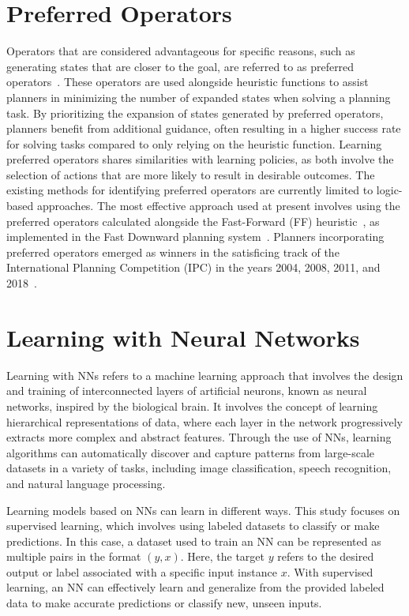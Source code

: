 \documentclass[ppgc,diss,english]{iiufrgs}
\begin{document}
\section{Preferred Operators}
\label{sec:intro-preferred-ops}
Operators that are considered advantageous for specific reasons, such as generating states that are closer to the goal, are referred to as preferred operators~\cite{Helmert/2006,Richter.Helmert/2009}. These operators are used alongside heuristic functions to assist planners in minimizing the number of expanded states when solving a planning task.
By prioritizing the expansion of states generated by preferred operators, planners benefit from additional guidance, often resulting in a higher success rate for solving tasks compared to only relying on the heuristic function. Learning preferred operators shares similarities with learning policies, as both involve the selection of actions that are more likely to result in desirable outcomes. The existing methods for identifying preferred operators are currently limited to logic-based approaches. The most effective approach used at present involves using the preferred operators calculated alongside the Fast-Forward (FF) heuristic~\cite{Hoffmann.Nebel/2001}, as implemented in the Fast Downward planning system~\cite{Helmert/2006}. Planners incorporating preferred operators emerged as winners in the satisficing track of the International Planning Competition (IPC) in the years 2004, 2008, 2011, and 2018~\cite{Helmert/2006,Richter.lama.etal/2011,Richter.lama.etal/2011,Seipp-fast.etal/2018}.

\section{Learning with Neural Networks}
\label{sec:intro-deep-learning}
Learning with NNs refers to a machine learning approach that involves the design and training of interconnected layers of artificial neurons, known as neural networks, inspired by the biological brain.
It involves the concept of learning hierarchical representations of data, where each layer in the network progressively extracts more complex and abstract features. Through the use of NNs, learning algorithms can automatically discover and capture patterns from large-scale datasets in a variety of tasks, including image classification, speech recognition, and natural language processing.

Learning models based on NNs can learn in different ways. This study focuses on supervised learning, which involves using labeled datasets to classify or make predictions. In this case, a dataset used to train an NN can be represented as multiple pairs in the format $(y, x)$. Here, the target $y$ refers to the desired output or label associated with a specific input instance $x$. With supervised learning, an NN can effectively learn and generalize from the provided labeled data to make accurate predictions or classify new, unseen inputs.
\end{document}

